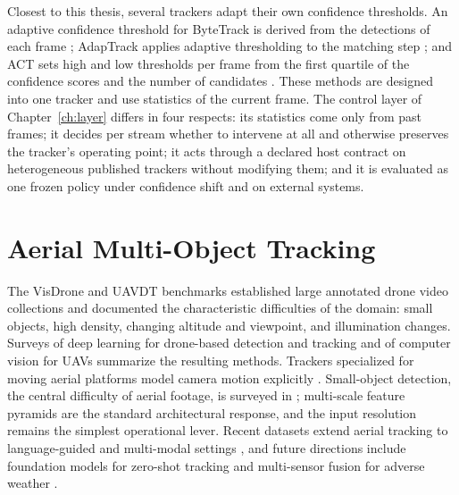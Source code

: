 Closest to this thesis, several trackers adapt their own confidence thresholds. An adaptive confidence threshold for ByteTrack is derived from the detections of each frame \cite{ma2023adaptivebytetrack}; AdapTrack applies adaptive thresholding to the matching step \cite{shim2024adaptrack}; and ACT sets high and low thresholds per frame from the first quartile of the confidence scores and the number of candidates \cite{act2026adaptive}. These methods are designed into one tracker and use statistics of the current frame. The control layer of Chapter~\ref{ch:layer} differs in four respects: its statistics come only from past frames; it decides per stream whether to intervene at all and otherwise preserves the tracker's operating point; it acts through a declared host contract on heterogeneous published trackers without modifying them; and it is evaluated as one frozen policy under confidence shift and on external systems.

\section{Aerial Multi-Object Tracking}\label{sec:bg-aerial}
The VisDrone \cite{zhu2022visdrone} and UAVDT \cite{du2018uavdt} benchmarks established large annotated drone video collections and documented the characteristic difficulties of the domain: small objects, high density, changing altitude and viewpoint, and illumination changes. Surveys of deep learning for drone-based detection and tracking \cite{wu2022uavsurvey} and of computer vision for UAVs \cite{kanellakis2017uavvision} summarize the resulting methods. Trackers specialized for moving aerial platforms model camera motion explicitly \cite{liu2022uavmot}. Small-object detection, the central difficulty of aerial footage, is surveyed in \cite{cheng2023smallobject}; multi-scale feature pyramids \cite{lin2017fpn} are the standard architectural response, and the input resolution remains the simplest operational lever. Recent datasets extend aerial tracking to language-guided and multi-modal settings \cite{ismail2026realtime}, and future directions include foundation models for zero-shot tracking \cite{awais2025foundation} and multi-sensor fusion for adverse weather \cite{chae2024radar}.

